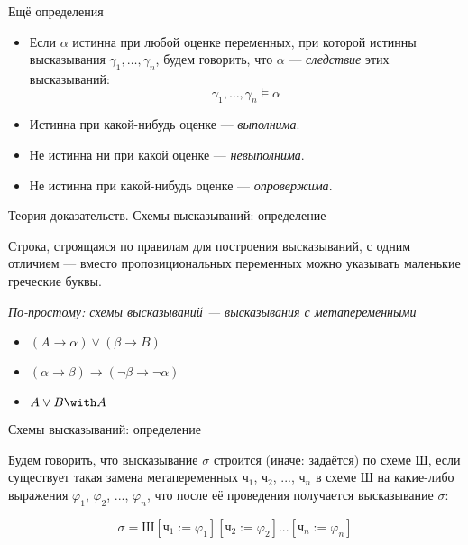 \documentclass[aspectratio=169]{beamer}
\begin{document}
\begin{frame}{Ещё определения}
\begin{itemize}
\item Если $\alpha$ истинна при любой оценке переменных, при которой истинны 
высказывания $\gamma_1, \dots, \gamma_n$, будем говорить, что $\alpha$ --- \emph{следствие} этих высказываний:
$$\gamma_1, \dots, \gamma_n \models \alpha$$\pause
\item Истинна при какой-нибудь оценке --- \emph{выполнима}.\pause
\item Не истинна ни при какой оценке --- \emph{невыполнима}.\pause
\item Не истинна при какой-нибудь оценке --- \emph{опровержима}.
\end{itemize}
\end{frame}

\begin{frame}{Теория доказательств. Схемы высказываний: определение}

\begin{defrus} Строка, строящаяся по правилам для построения высказываний, с одним отличием ---
вместо пропозициональных переменных можно указывать маленькие греческие буквы.\end{defrus}\pause

\emph{По-простому: схемы высказываний --- высказывания с метапеременными}\pause

\begin{exmprus}
\begin{itemize}
\item $(A \rightarrow \alpha) \vee (\beta \rightarrow B)$\pause
\item $(\alpha\rightarrow\beta)\rightarrow(\neg\beta\rightarrow\neg\alpha)$\pause
\item $A\vee B \with A$
\end{itemize}
\end{exmprus}

\end{frame}

\begin{frame}{Схемы высказываний: определение}

\begin{defrus}Будем говорить, что высказывание $\sigma$ строится (иначе: задаётся) по схеме $\textit{Ш}$, 
если существует такая замена метапеременных $\textit{ч}_1$, $\textit{ч}_2$, ..., $\textit{ч}_n$ 
в схеме $\textit{Ш}$ на какие-либо выражения $\varphi_1$, $\varphi_2$, ..., $\varphi_n$, 
что после её проведения получается высказывание $\sigma$:

$$\sigma = \textit{Ш}[\textit{ч}_1 := \varphi_1][\textit{ч}_2 := \varphi_2]...[\textit{ч}_n := \varphi_n]$$

\end{defrus}
\end{frame}
\end{document}
